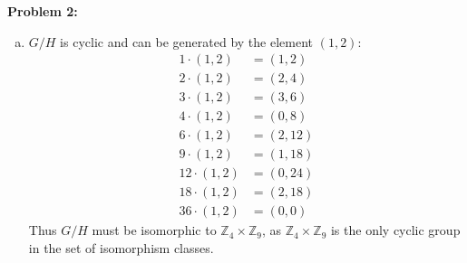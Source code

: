 \documentclass[12pt, letterpaper]{article}
\newenvironment{problem}
    [1]
    {\noindent \textbf{Problem #1:}}
    {\vspace{3mm}}
\begin{document}
\begin{problem}{2}
\begin{enumerate}[(a)]
        \item $G/H$ is cyclic and can be generated by the element $(1, 2)$:
        \begin{align*}
            1 \cdot (1, 2) &= (1, 2)\\
            2 \cdot (1, 2) &= (2, 4)\\
            3 \cdot (1, 2) &= (3, 6)\\
            4 \cdot (1, 2) &= (0, 8)\\
            6 \cdot (1, 2) &= (2, 12)\\
            9 \cdot (1, 2) &= (1, 18)\\
            12 \cdot (1, 2) &= (0, 24)\\
            18 \cdot (1, 2) &= (2, 18)\\
            36 \cdot (1, 2) &= (0, 0)
        \end{align*}
        Thus $G/H$ must be isomorphic to $\mathbb{Z}_4 \times \mathbb{Z}_9$, as $\mathbb{Z}_4 \times 
        \mathbb{Z}_9$ is the only cyclic group in the set of isomorphism classes.
    \end{enumerate}
\end{problem}
\end{document}
